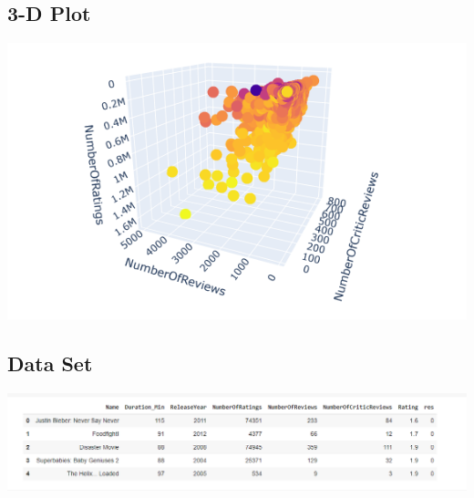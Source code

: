 \documentclass{article}
\begin{document}
\subsection{3-D Plot}
\begin{figure}
\end{figure}
\begin{center}
\includegraphics[scale=0.5]{3D_Plot}
\label{figure}
\end{center}
\subsection{Data Set}
\begin{figure}
\end{figure}
\begin{center}
\includegraphics[scale=0.5]{DataBase}
\label{figure}
\end{center}
\newpage
\end{document}
